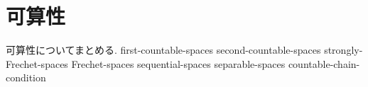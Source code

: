 \documentclass[uplatex, dvipdfmx, a4paper, 12pt, class=jsbook, crop=false]{standalone}
\begin{document}
\chapter{可算性}
\label{chap:countability}

可算性についてまとめる.
{first-countable-spaces}
{second-countable-spaces}
{strongly-Frechet-spaces}
{Frechet-spaces}
{sequential-spaces}
{separable-spaces}
{countable-chain-condition}
\end{document}
